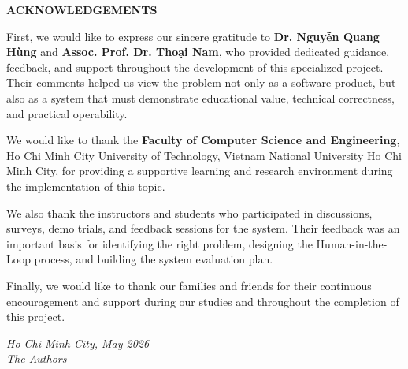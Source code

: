 \begin{center}
    \textbf{\Large ACKNOWLEDGEMENTS}
\end{center}

\vspace{1cm}

First, we would like to express our sincere gratitude to
\textbf{Dr. Nguyễn Quang Hùng} and \textbf{Assoc. Prof. Dr. Thoại Nam}, who
provided dedicated guidance, feedback, and support throughout the development
of this specialized project. Their comments helped us view the problem not only
as a software product, but also as a system that must demonstrate educational
value, technical correctness, and practical operability.

We would like to thank the \textbf{Faculty of Computer Science and
Engineering}, Ho Chi Minh City University of Technology, Vietnam National
University Ho Chi Minh City, for providing a supportive learning and research
environment during the implementation of this topic.

We also thank the instructors and students who participated in discussions,
surveys, demo trials, and feedback sessions for the system. Their feedback was
an important basis for identifying the right problem, designing the
Human-in-the-Loop process, and building the system evaluation plan.

Finally, we would like to thank our families and friends for their continuous
encouragement and support during our studies and throughout the completion of
this project.

\vspace{1.5cm}

\begin{flushright}
    \textit{Ho Chi Minh City, May 2026}\\[0.5cm]
    \textit{The Authors}
\end{flushright}
